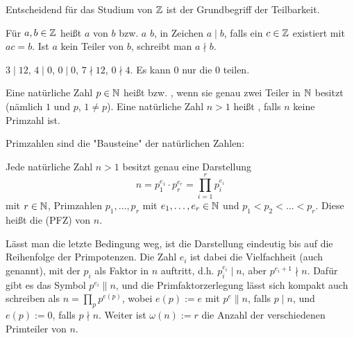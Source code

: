 Entscheidend für das Studium von $\mathbb{Z}$ ist der Grundbegriff der Teilbarkeit.
\begin{defn}[Teilbarkeit]
	Für $a,b \in \mathbb{Z}$ heißt $a$  von $b$ bzw. $a$  $b$, in Zeichen $a \mid b$, falls ein $c \in \mathbb{Z}$ existiert mit $ac = b$. 
	Ist $a$ kein Teiler von $b$, schreibt man $a \nmid b$.
\end{defn}

\begin{bsp}
	$3 \mid 12$, $4 \mid 0$, $0 \mid 0$, $7 \nmid 12$, $0 \nmid 4$. 
	Es kann $0$ nur die $0$ teilen.
\end{bsp}

\begin{defn}[Primzahl]
	Eine natürliche Zahl $p \in \mathbb{N}$ heißt  bzw. , wenn sie genau zwei Teiler in $\mathbb{N}$ besitzt (nämlich $1$ und $p$, $1 \neq p$). 
	Eine natürliche Zahl $n > 1$ heißt , falls $n$ keine Primzahl ist. 
\end{defn}

Primzahlen sind die "Bausteine" der natürlichen Zahlen:
\begin{satz}
	Jede natürliche Zahl $n > 1$ besitzt genau eine Darstellung
	\[ n = p_1^{e_1} \cdot p_r^{e_r} = \prod\limits_{i=1}^{r} p_i^{e_i} \]
	mit $r \in \mathbb{N}$, Primzahlen $p_1, \dots, p_r$ mit $e_1,\dots,e_r \in \mathbb{N}$ und $p_1 < p_2 < \dots < p_r$. Diese heißt die  (PFZ) von $n$.
\end{satz}

\begin{bem}
	Lässt man die letzte Bedingung weg, ist die Darstellung eindeutig bis auf die Reihenfolge der Primpotenzen. 
	Die Zahl $e_i$ ist dabei die Vielfachheit (auch  genannt), mit der $p_i$ als Faktor in $n$ auftritt, d.h. $p_i^{e_i} \mid n$, aber $p^{e_i+1} \nmid n$. 
	Dafür gibt es das Symbol $p^{e_i} \parallel n$, und die Primfaktorzerlegung lässt sich kompakt auch schreiben als $n = \prod\limits_{p} p^{e(p)}$, wobei $e(p) := e$ mit $p^e \parallel n$, falls $p \mid n$, und $e(p) := 0$, falls $p \nmid n$. 
	Weiter ist $\omega(n) := r$ die Anzahl der verschiedenen Primteiler von $n$.
\end{bem}

